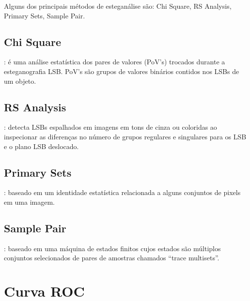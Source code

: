 Alguns dos principais métodos de esteganálise são: Chi Square, RS Analysis, Primary Sets, Sample Pair.

\subsection{Chi Square}
\cite{westfeld1999attacks}: é uma análise estatística dos pares de valores (PoV's) trocados durante a esteganografia LSB. PoV's são grupos de valores binários contidos nos LSBs de um objeto.

\subsection{RS Analysis}
\cite{fridrich2001reliable}: detecta LSBs espalhados em imagens em tons de cinza ou coloridas ao inspecionar as diferenças no número de grupos regulares e singulares para os LSB e o plano LSB deslocado.

\subsection{Primary Sets}
\cite{dumitrescu2002steganalysis}: baseado em um identidade estatística relacionada a alguns conjuntos de pixels em uma imagem.

\subsection{Sample Pair}
\cite{dumitrescu2003detection}: baseado em uma máquina de estados finitos cujos estados são múltiplos conjuntos selecionados de pares de amostras chamados ``trace multisets''.


\section{Curva ROC}


